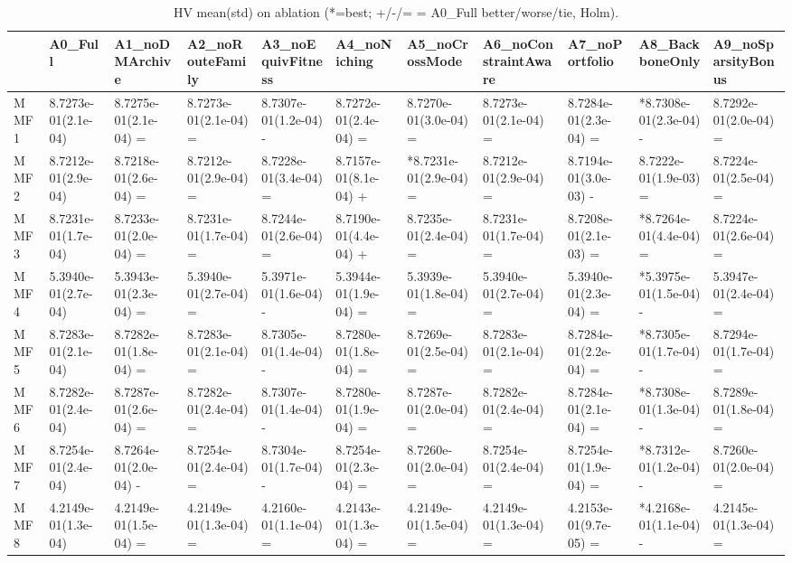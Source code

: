 \begin{table}[t]
\centering
\caption{HV mean(std) on ablation (*=best; +/-/= = A0_Full better/worse/tie, Holm).}
\label{tab:ablation_HV}
\begin{tabular}{lllllllllll}
\toprule
 & A0\_Full & A1\_noDMArchive & A2\_noRouteFamily & A3\_noEquivFitness & A4\_noNiching & A5\_noCrossMode & A6\_noConstraintAware & A7\_noPortfolio & A8\_BackboneOnly & A9\_noSparsityBonus \\
\midrule
MMF1 & 8.7273e-01(2.1e-04) & 8.7275e-01(2.1e-04) = & 8.7273e-01(2.1e-04) = & 8.7307e-01(1.2e-04) - & 8.7272e-01(2.4e-04) = & 8.7270e-01(3.0e-04) = & 8.7273e-01(2.1e-04) = & 8.7284e-01(2.3e-04) = & *8.7308e-01(2.3e-04) - & 8.7292e-01(2.0e-04) = \\
MMF2 & 8.7212e-01(2.9e-04) & 8.7218e-01(2.6e-04) = & 8.7212e-01(2.9e-04) = & 8.7228e-01(3.4e-04) = & 8.7157e-01(8.1e-04) + & *8.7231e-01(2.9e-04) = & 8.7212e-01(2.9e-04) = & 8.7194e-01(3.0e-03) - & 8.7222e-01(1.9e-03) = & 8.7224e-01(2.5e-04) = \\
MMF3 & 8.7231e-01(1.7e-04) & 8.7233e-01(2.0e-04) = & 8.7231e-01(1.7e-04) = & 8.7244e-01(2.6e-04) = & 8.7190e-01(4.4e-04) + & 8.7235e-01(2.4e-04) = & 8.7231e-01(1.7e-04) = & 8.7208e-01(2.1e-03) = & *8.7264e-01(4.4e-04) = & 8.7224e-01(2.6e-04) = \\
MMF4 & 5.3940e-01(2.7e-04) & 5.3943e-01(2.3e-04) = & 5.3940e-01(2.7e-04) = & 5.3971e-01(1.6e-04) - & 5.3944e-01(1.9e-04) = & 5.3939e-01(1.8e-04) = & 5.3940e-01(2.7e-04) = & 5.3940e-01(2.3e-04) = & *5.3975e-01(1.5e-04) - & 5.3947e-01(2.4e-04) = \\
MMF5 & 8.7283e-01(2.1e-04) & 8.7282e-01(1.8e-04) = & 8.7283e-01(2.1e-04) = & 8.7305e-01(1.4e-04) - & 8.7280e-01(1.8e-04) = & 8.7269e-01(2.5e-04) = & 8.7283e-01(2.1e-04) = & 8.7284e-01(2.2e-04) = & *8.7305e-01(1.7e-04) - & 8.7294e-01(1.7e-04) = \\
MMF6 & 8.7282e-01(2.4e-04) & 8.7287e-01(2.6e-04) = & 8.7282e-01(2.4e-04) = & 8.7307e-01(1.4e-04) - & 8.7280e-01(1.9e-04) = & 8.7287e-01(2.0e-04) = & 8.7282e-01(2.4e-04) = & 8.7284e-01(2.1e-04) = & *8.7308e-01(1.3e-04) - & 8.7289e-01(1.8e-04) = \\
MMF7 & 8.7254e-01(2.4e-04) & 8.7264e-01(2.0e-04) - & 8.7254e-01(2.4e-04) = & 8.7304e-01(1.7e-04) - & 8.7254e-01(2.3e-04) = & 8.7260e-01(2.0e-04) = & 8.7254e-01(2.4e-04) = & 8.7254e-01(1.9e-04) = & *8.7312e-01(1.2e-04) - & 8.7260e-01(2.0e-04) = \\
MMF8 & 4.2149e-01(1.3e-04) & 4.2149e-01(1.5e-04) = & 4.2149e-01(1.3e-04) = & 4.2160e-01(1.1e-04) = & 4.2143e-01(1.3e-04) = & 4.2149e-01(1.5e-04) = & 4.2149e-01(1.3e-04) = & 4.2153e-01(9.7e-05) = & *4.2168e-01(1.1e-04) - & 4.2145e-01(1.3e-04) = \\
\bottomrule
\end{tabular}
\end{table}
